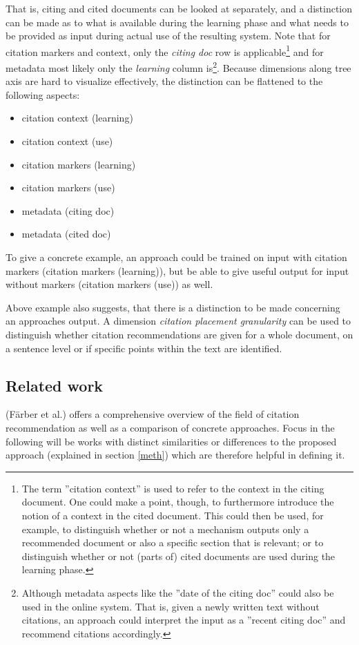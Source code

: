 \documentclass{proseminar}
\begin{document}
That is, citing and cited documents can be looked at separately, and a distinction can be made as to what is available during the learning phase and what needs to be provided as input during actual use of the resulting system. Note that for citation markers and context, only the \emph{citing doc} row is applicable\footnote{The term ''citation context'' is used to refer to the context in the citing document. One could make a point, though, to furthermore introduce the notion of a context in the cited document. This could then be used, for example, to distinguish whether or not a mechanism outputs only a recommended document or also a specific section that is relevant; or to distinguish whether or not (parts of) cited documents are used during the learning phase.} and for metadata most likely only the \emph{learning} column is\footnote{Although metadata aspects like the ''date of the citing doc'' could also be used in the online system. That is, given a newly written text without citations, an approach could interpret the input as a ''recent citing doc'' and recommend citations accordingly.}. Because dimensions along tree axis are hard to visualize effectively, the distinction can be flattened to the following aspects:

\begin{itemize}
    \item citation context (learning)
    \item citation context (use)
    \item citation markers (learning)
    \item citation markers (use)
    \item metadata (citing doc)
    \item metadata (cited doc)
\end{itemize}

To give a concrete example, an approach could be trained on input with citation markers (citation markers (learning)),  but be able to give useful output for input without markers (citation markers (use)) as well.

Above example also suggests, that there is a distinction to be made concerning an approaches output. A dimension \emph{citation placement granularity} can be used to distinguish whether citation recommendations are given for a whole document, on a sentence level or if specific points within the text are identified.

\subsection{Related work}
\cite{Faerber} (F\"arber et al.) offers a comprehensive overview of the field of citation recommendation as well as a comparison of concrete approaches. Focus in the following will be works with distinct similarities or differences to the proposed approach (explained in section \ref{meth}) which are therefore helpful in defining it.
\end{document}
